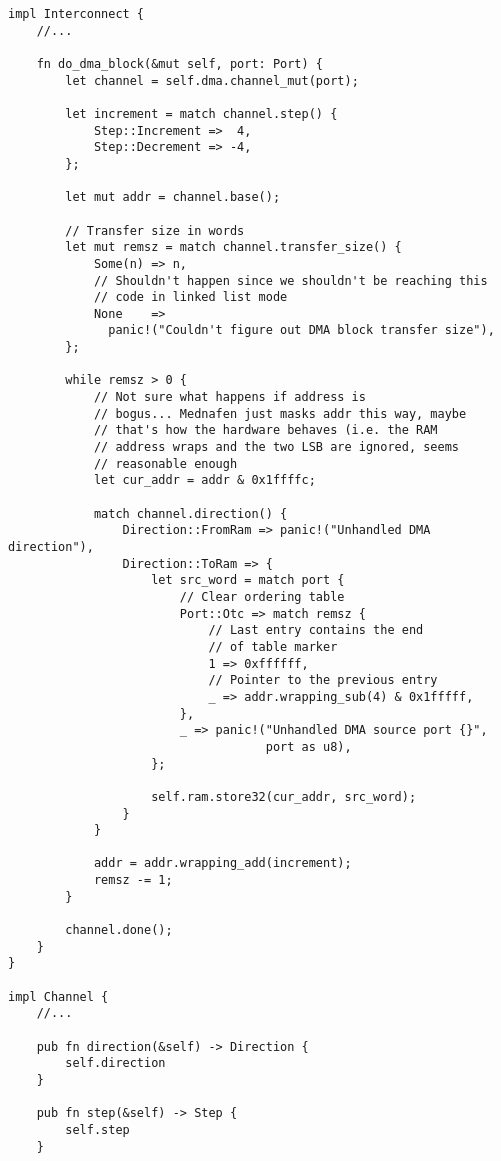 \documentclass[a4paper]{article}
\begin{document}
\begin{lstlisting}
impl Interconnect {
    //...

    fn do_dma_block(&mut self, port: Port) {
        let channel = self.dma.channel_mut(port);

        let increment = match channel.step() {
            Step::Increment =>  4,
            Step::Decrement => -4,
        };

        let mut addr = channel.base();

        // Transfer size in words
        let mut remsz = match channel.transfer_size() {
            Some(n) => n,
            // Shouldn't happen since we shouldn't be reaching this
            // code in linked list mode
            None    =>
              panic!("Couldn't figure out DMA block transfer size"),
        };

        while remsz > 0 {
            // Not sure what happens if address is
            // bogus... Mednafen just masks addr this way, maybe
            // that's how the hardware behaves (i.e. the RAM
            // address wraps and the two LSB are ignored, seems
            // reasonable enough
            let cur_addr = addr & 0x1ffffc;

            match channel.direction() {
                Direction::FromRam => panic!("Unhandled DMA direction"),
                Direction::ToRam => {
                    let src_word = match port {
                        // Clear ordering table
                        Port::Otc => match remsz {
                            // Last entry contains the end
                            // of table marker
                            1 => 0xffffff,
                            // Pointer to the previous entry
                            _ => addr.wrapping_sub(4) & 0x1fffff,
                        },
                        _ => panic!("Unhandled DMA source port {}",
                                    port as u8),
                    };

                    self.ram.store32(cur_addr, src_word);
                }
            }

            addr = addr.wrapping_add(increment);
            remsz -= 1;
        }

        channel.done();
    }
}

impl Channel {
    //...

    pub fn direction(&self) -> Direction {
        self.direction
    }

    pub fn step(&self) -> Step {
        self.step
    }


\end{lstlisting}
\end{document}
